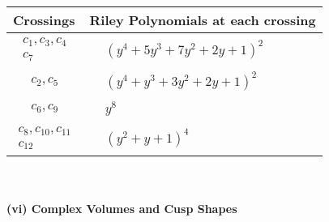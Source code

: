 \documentclass[1p]{elsarticle_modified}
\theoremstyle{definition}
\begin{document}
\begin{tabular}{m{50pt}|m{274pt}}
Crossings & \hspace{64pt}Riley Polynomials at each crossing \\
\hline $$\begin{aligned}c_{1},c_{3},c_{4}\\c_{7}\end{aligned}$$&$\begin{aligned}
&(y^4+5 y^3+7 y^2+2 y+1)^2
\end{aligned}$\\
\hline $$\begin{aligned}c_{2},c_{5}\end{aligned}$$&$\begin{aligned}
&(y^4+y^3+3 y^2+2 y+1)^2
\end{aligned}$\\
\hline $$\begin{aligned}c_{6},c_{9}\end{aligned}$$&$\begin{aligned}
&y^8
\end{aligned}$\\
\hline $$\begin{aligned}c_{8},c_{10},c_{11}\\c_{12}\end{aligned}$$&$\begin{aligned}
&(y^2+y+1)^4
\end{aligned}$\\
\hline
\end{tabular}\\~\\
\newpage\flushleft \textbf{(vi) Complex Volumes and Cusp Shapes}
\end{document}
